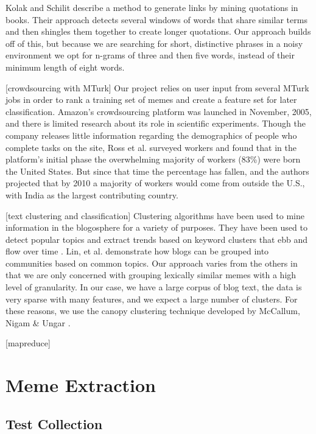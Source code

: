 \documentclass{sig-alternate}
\begin{document}
Kolak and Schilit \cite{Kolak&Schilit2008} describe a method to generate links by mining quotations in books.  Their approach detects several windows of words that share similar terms and then shingles them together to create longer quotations.  Our approach builds off of this, but because we are searching for short, distinctive phrases in a noisy environment we opt for n-grams of three and then five words, instead of their minimum length of eight words.
 
[crowdsourcing with MTurk] 
Our project relies on user input from several MTurk jobs in order to rank a training set of memes and create a feature set for later classification.  Amazon's crowdsourcing platform was launched in November, 2005, and there is limited research about its role in scientific experiments.  Though the company releases little information regarding the demographics of people who complete tasks on the site, Ross et al. \cite{Ross,etal2010} surveyed workers and found that in the platform's initial phase the overwhelming majority of workers (83\%) were born the United States.  But since that time the percentage has fallen, and the authors projected that by 2010 a majority of workers would come from outside the U.S., with India as the largest contributing country. 

[text clustering and classification]
Clustering algorithms have been used to mine information in the blogosphere for a variety of purposes.  They have been used to detect popular topics and extract trends based on keyword clusters that ebb and flow over time \cite{Qmara,Tseng&Chang2006} \cite{Bansal,etal2007}.  Lin, et al. \cite{Lin,etal2007} demonstrate how blogs can be grouped into communities based on common topics.  Our approach varies from the others in that we are only concerned with grouping lexically similar memes with a high level of granularity.  In our case, we have a large corpus of blog text, the data is very sparse with many features, and we expect a large number of clusters.  For these reasons, we use the canopy clustering technique developed by McCallum, Nigam & Ungar \cite{McCallum2008}.   

[mapreduce]
\cite{Dean&Ghemawat2008} 

\section{Meme Extraction}

\subsection{Test Collection}
\end{document}
